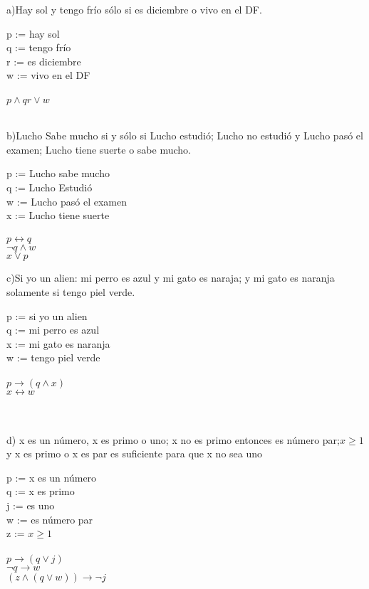 \documentclass{article}
\begin{document}
a)Hay sol y tengo frío sólo si es diciembre o vivo en el DF.\\
\begin{center}
  p := hay sol\\
  q := tengo frío\\
  r := es diciembre\\
  w := vivo en el DF\\\\

  $p\wedge q $\rightarrow $r \vee w$
\end{center}
\\
b)Lucho Sabe mucho si y sólo si Lucho estudió; Lucho no estudió y Lucho pasó el examen; Lucho tiene suerte o sabe mucho.\\
\begin{center}
  p := Lucho sabe mucho\\
  q := Lucho Estudió\\
  w := Lucho pasó el examen\\
  x := Lucho tiene suerte\\\\
  $p \leftrightarrow q$\\
  $\neg q \wedge w$\\
  $x \vee p$
\end{center}
c)Si yo un alien: mi perro es azul y mi gato es naraja; y mi gato es naranja solamente si tengo piel verde.\\
\begin{center}
p := si yo un alien\\
q := mi perro es azul\\
x := mi gato es naranja\\
w := tengo piel verde\\\\

$p \rightarrow (q\wedge x)$\\
$x \leftrightarrow w$
\end{center}
\\
\\
d) x es un número, x es primo o uno; x no es primo entonces es número par;$x \geq 1$y x es primo o x es par es suficiente para que x no sea uno\\
\begin{center}
  p := x es un número\\
  q := x es primo\\
  j :=   es uno\\
  w := es número par\\
  z := $x \geq 1$\\\\

  $p \rightarrow (q\vee j)$\\
  $\neg q \rightarrow w$\\
  $(z \wedge (q \vee w))\rightarrow \neg j$\\

  
\end{center}
\end{document}
